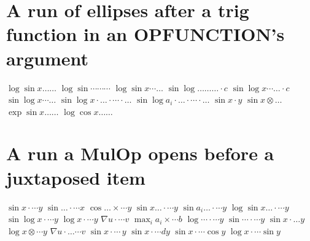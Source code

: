 \documentclass{article}
\begin{document}
\section{A run of ellipses after a trig function in an OPFUNCTION's argument}
$\log\sin x\ldots\ldots$ $\log\sin\cdots\cdots\cdots$ $\log\sin x\cdots\dots$ $\sin\log\ldots\ldots\ldots\cdot c$
$\sin\log x\cdots\dots\cdot c$ $\sin\log x\cdots\dots$
$\sin\log x\cdot\ldots\cdot\cdots\cdot\ldots$ $\sin\log a_i\cdot\ldots\cdot\cdots\cdot\ldots$ $\sin x\cdot y$ $\sin x\otimes\ldots$
$\exp\sin x\ldots\ldots$ $\log\cos x\ldots\ldots$

\section{A run a MulOp opens before a juxtaposed item}
$\sin x\cdot\cdots y$ $\sin\ldots\cdot\cdots x$ $\cos\dots\times\cdots y$ $\sin x\ldots\cdot\cdots y$ $\sin a_i\ldots\cdot\cdots y$
$\log\sin x\ldots\cdot\cdots y$ $\sin\log x\cdot\cdots y$ $\log x\cdot\cdots y$ $\nabla u\cdot\cdots v$ $\max_i a_i\times\cdots b$
$\log\cdots\cdot\cdots y$ $\sin\cdots\cdot\cdots y$ $\sin x\cdot\ldots y$ $\log x\otimes\cdots y$ $\nabla u\cdot\ldots\cdots v$
$\sin x\cdot\cdots\,y$ $\sin x\cdot\cdots dy$ $\sin x\cdot\cdots\cos y$ $\log x\cdot\cdots\sin y$
\end{document}
